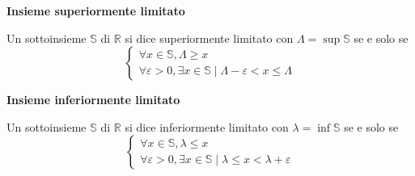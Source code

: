 \begin{definition}\label{def:sup-lim-rea}
    \textbf{Insieme superiormente limitato}

    Un sottoinsieme $\mathbb{S}$ di $\mathbb{R}$ si dice superiormente limitato con
    $\Lambda=\sup\mathbb{S}$ se e solo se
    \[
        \begin{cases}
            \forall x\in\mathbb{S}, \Lambda \geq x\\
            \forall \varepsilon > 0, \exists x\in\mathbb{S} \mid \Lambda-\varepsilon<x\leq\Lambda
        \end{cases}
    \]
\end{definition}

\begin{definition}\label{def:inf-lim-rea}
    \textbf{Insieme inferiormente limitato}

    Un sottoinsieme $\mathbb{S}$ di $\mathbb{R}$ si dice inferiormente limitato con
    $\lambda=\inf\mathbb{S}$ se e solo se
    \[
        \begin{cases}
            \forall x\in\mathbb{S}, \lambda \leq x\\
            \forall \varepsilon > 0, \exists x\in\mathbb{S} \mid \lambda\leq x<\lambda+\varepsilon
        \end{cases}
    \]
\end{definition}

